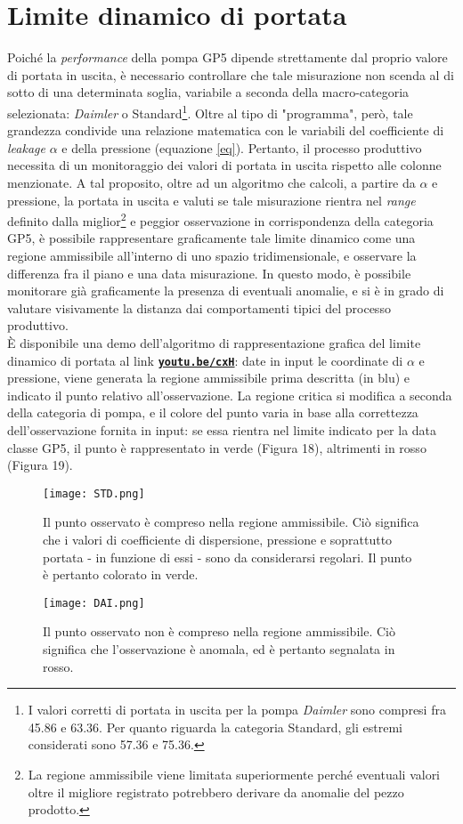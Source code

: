 \documentclass[fleqn,10pt]{SelfArx} %
\begin{document}
\section{Limite dinamico di portata}\label{lim}
Poiché la \textit{performance} della pompa GP5 dipende strettamente dal proprio valore di portata in uscita, è necessario controllare che tale misurazione non scenda al di sotto di una determinata soglia, variabile a seconda della macro-categoria selezionata: \textit{Daimler} o Standard\footnote{I valori corretti di portata in uscita per la pompa \textit{Daimler} sono compresi fra 45.86 e 63.36. Per quanto riguarda la categoria Standard, gli estremi considerati sono 57.36 e 75.36.}. Oltre al tipo di "programma", però, tale grandezza condivide una relazione matematica con le variabili del coefficiente di \textit{leakage} $\alpha$ e della pressione (equazione \ref{eq}). Pertanto, il processo produttivo necessita di un monitoraggio dei valori di portata in uscita rispetto alle colonne menzionate. A tal proposito, oltre ad un algoritmo che calcoli, a partire da $\alpha$ e pressione, la portata in uscita e valuti se tale misurazione rientra nel \textit{range} definito dalla miglior\footnote{La regione ammissibile viene limitata superiormente perché eventuali valori oltre il migliore registrato potrebbero derivare da anomalie del pezzo prodotto.} e peggior osservazione in corrispondenza della categoria GP5, è possibile rappresentare graficamente tale limite dinamico come una regione ammissibile all'interno di uno spazio tridimensionale, e osservare la differenza fra il piano e una data misurazione. In questo modo, è possibile monitorare già graficamente la presenza di eventuali anomalie, e si è in grado di valutare visivamente la distanza dai comportamenti tipici del processo produttivo.\\
È disponibile una demo dell'algoritmo di rappresentazione grafica del limite dinamico di portata al link \href{https://www.youtube.com/watch?v=cxHw8cPm-Ek}{\textbf{\texttt{youtu.be/cxH}}}: date in input le coordinate di $\alpha$ e pressione, viene generata la regione ammissibile prima descritta (in blu) e indicato il punto relativo all'osservazione. La regione critica si modifica a seconda della categoria di pompa, e il colore del punto varia in base alla correttezza dell'osservazione fornita in input: se essa rientra nel limite indicato per la data classe GP5, il punto è rappresentato in verde (Figura 18), altrimenti in rosso (Figura 19).
\begin{figure}[h]
    \centering
    \texttt{[image: STD.png]}
    \label{fig:em}
    \caption{Il punto osservato è compreso nella regione ammissibile. Ciò significa che i valori di coefficiente di dispersione, pressione e soprattutto portata - in funzione di essi - sono da considerarsi regolari. Il punto è pertanto colorato in verde.}
\end{figure}
\begin{figure}[h]
    \centering
    \texttt{[image: DAI.png]}
    \label{fig:em}
    \caption{Il punto osservato non è compreso nella regione ammissibile. Ciò significa che l'osservazione è anomala, ed è pertanto segnalata in rosso.}
\end{figure}
\end{document}
